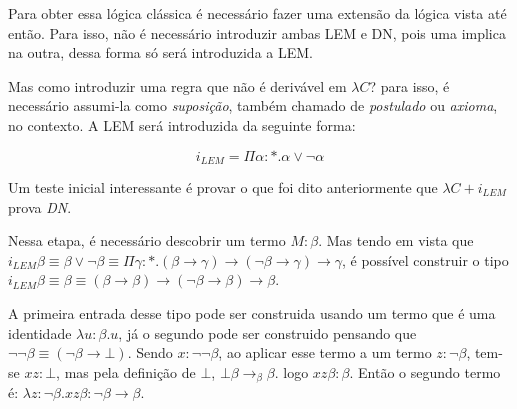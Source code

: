 \documentclass[../main.tex]{subfiles}
\begin{document}
Para obter essa lógica clássica é necessário fazer uma extensão da lógica vista até então. Para isso, não é necessário introduzir ambas LEM e DN, pois uma implica na outra, dessa forma só será introduzida a LEM. 

Mas como introduzir uma regra que não é derivável em $\lambda C$? para isso, é necessário assumi-la como \emph{suposição}, também chamado de \emph{postulado} ou \emph{axioma}, no contexto. A LEM será introduzida da seguinte forma:

$$i_{LEM} = \Pi \alpha : \ast . \alpha \lor \neg \alpha$$

Um teste inicial interessante é provar o que foi dito anteriormente que $\lambda C + i_{LEM}$ prova \emph{DN}.

\begin{prooftree}
    
\end{prooftree}

\begin{prooftree}
\end{prooftree}

\begin{prooftree}
\end{prooftree}

Nessa etapa, é necessário descobrir um termo $M : \beta$. Mas tendo em vista que $i_{LEM}\beta \equiv \beta \lor \neg \beta \equiv \Pi \gamma : \ast . (\beta \to \gamma) \to (\neg \beta \to \gamma) \to \gamma$, é possível construir o tipo $i_{LEM}\beta \equiv\beta \equiv (\beta \to \beta) \to (\neg \beta \to \beta) \to \beta$.

A primeira entrada desse tipo pode ser construida usando um termo que é uma identidade $\lambda u : \beta . u$, já o segundo pode ser construido pensando que $\neg \neg \beta \equiv (\neg \beta \to \bot)$. Sendo $x : \neg \neg \beta$, ao aplicar esse termo a um termo $z : \neg \beta$, tem-se $xz : \bot$, mas pela definição de $\bot$, $\bot\beta \to_{\beta} \beta$. logo $xz\beta : \beta$. Então o segundo termo é: $\lambda z : \neg \beta . xz\beta : \neg \beta \to \beta$.
\end{document}
